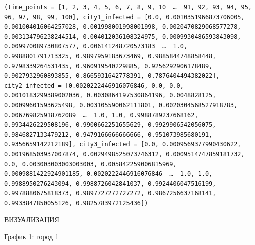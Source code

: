 \documentclass[
  12pt,
  a4paper,
  DIV=11,
  numbers=noendperiod]{scrreprt}
\begin{document}
\begin{verbatim}
(time_points = [1, 2, 3, 4, 5, 6, 7, 8, 9, 10  …  91, 92, 93, 94, 95, 96, 97, 98, 99, 100], city1_infected = [0.0, 0.0010351966873706005, 0.001004016064257028, 0.001998001998001998, 0.0020470829068577278, 0.003134796238244514, 0.004012036108324975, 0.0009930486593843098, 0.009970089730807577, 0.006141248720573183  …  1.0, 0.9988801791713325, 0.9897959183673469, 0.9885844748858448, 0.9798339264531435, 0.960919540229885, 0.9256292906178489, 0.9027932960893855, 0.8665931642778391, 0.7876404494382022], city2_infected = [0.0020222446916076846, 0.0, 0.0, 0.0010183299389002036, 0.0030864197530864196, 0.0048828125, 0.00099601593625498, 0.003105590062111801, 0.0020304568527918783, 0.006769825918762089  …  1.0, 1.0, 0.9988789237668162, 0.9934426229508196, 0.9900662251655629, 0.9929906542056075, 0.9846827133479212, 0.9479166666666666, 0.951073985680191, 0.9356659142212189], city3_infected = [0.0, 0.0009569377990430622, 0.001968503937007874, 0.0029498525073746312, 0.0009514747859181732, 0.0, 0.003003003003003003, 0.005842259006815969, 0.0009881422924901185, 0.0020222446916076846  …  1.0, 1.0, 0.9988950276243094, 0.9988726042841037, 0.9924406047516199, 0.9978880675818373, 0.9897727272727272, 0.9867256637168141, 0.9933847850055126, 0.9825783972125436])
\end{verbatim}

ВИЗУАЛИЗАЦИЯ

График 1: город 1
\end{document}
